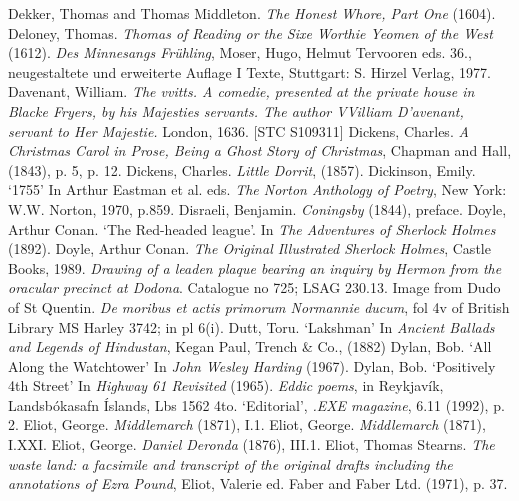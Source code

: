 \begin{bibitemlist}{1}
 Dekker, Thomas and Thomas Middleton. \textit{The Honest Whore, Part One} (1604).
 Deloney, Thomas. \textit{Thomas of Reading or the Sixe Worthie Yeomen of the West} (1612).
 \textit{Des Minnesangs Frühling}, Moser, Hugo, Helmut Tervooren eds. 36., neugestaltete und erweiterte Auflage I Texte, Stuttgart: S. Hirzel Verlag, 1977.
 Davenant, William. \textit{The vvitts. A comedie, presented at the private house in Blacke Fryers, by his Majesties servants. The author VVilliam D'avenant, servant to Her Majestie.} London, 1636. [STC S109311]
 Dickens, Charles. \textit{A Christmas Carol in Prose, Being a Ghost Story of Christmas}, Chapman and Hall, (1843), p. 5, p. 12.
 Dickens, Charles. \textit{Little Dorrit}, (1857).
 Dickinson, Emily. ‘1755’ In Arthur Eastman et al. eds. \textit{The Norton Anthology of Poetry}, New York: W.W. Norton, 1970, p.859.
 Disraeli, Benjamin. \textit{Coningsby} (1844), preface.
 Doyle, Arthur Conan. ‘The Red-headed league’. In \textit{The Adventures of Sherlock Holmes} (1892).
 Doyle, Arthur Conan. \textit{The Original Illustrated Sherlock Holmes}, Castle Books, 1989.
 \textit{Drawing of a leaden plaque bearing an inquiry by Hermon from the oracular precinct at Dodona}. Catalogue no 725; LSAG 230.13. Image from 
 Dudo of St Quentin. \textit{De moribus et actis primorum Normannie ducum}, fol 4v of British Library MS Harley 3742; in \cite{PARKES} pl 6(i).
 Dutt, Toru. ‘Lakshman’ In \textit{Ancient Ballads and Legends of Hindustan}, Kegan Paul, Trench \& Co., (1882)
 Dylan, Bob. ‘All Along the Watchtower’ In \textit{John Wesley Harding} (1967).
 Dylan, Bob. ‘Positively 4th Street’ In \textit{Highway 61 Revisited} (1965).
 \textit{Eddic poems}, in Reykjavík, Landsbókasafn Íslands, Lbs 1562 4to.
 ‘Editorial’, \textit{.EXE magazine}, 6.11  (1992), p. 2.
 Eliot, George. \textit{Middlemarch} (1871), I.1.
 Eliot, George. \textit{Middlemarch} (1871), I.XXI.
 Eliot, George. \textit{Daniel Deronda} (1876), III.1.
 Eliot, Thomas Stearns. \textit{The waste land: a facsimile and transcript of the original drafts including the annotations of Ezra Pound}, Eliot, Valerie ed. Faber and Faber Ltd. (1971), p. 37.

\end{bibitemlist}

